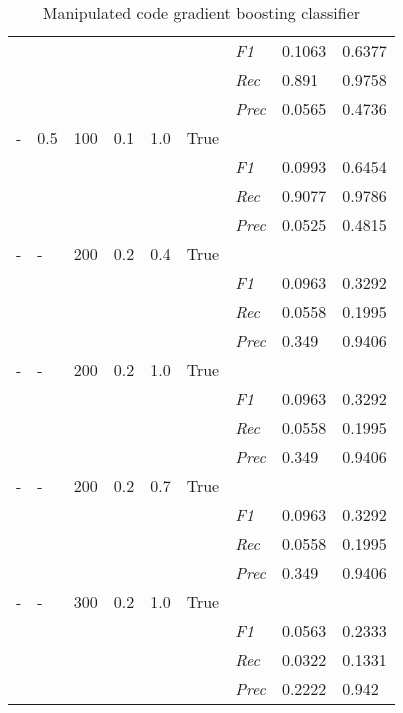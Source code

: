 \begin{table}[]
\begin{tabularx}{\textwidth}{XXXXXX|X|X|X}
    & & & & & & \textit{F1} & 0.1063 & 0.6377        \\
    & & & & & & \textit{Rec} &  0.891 & 0.9758    \\
    & & & & & & \textit{Prec} & 0.0565 & 0.4736  \\ \midrule
    - & 0.5 & 100 & 0.1 & 1.0 &True & & &  \\
    & & & & & & \textit{F1} & 0.0993 & 0.6454        \\
    & & & & & & \textit{Rec} &  0.9077 & 0.9786    \\
    & & & & & & \textit{Prec} & 0.0525 & 0.4815  \\ \midrule
    - & - & 200 & 0.2 & 0.4 &True & & &  \\
    & & & & & & \textit{F1} & 0.0963 & 0.3292        \\
    & & & & & & \textit{Rec} &  0.0558 & 0.1995    \\
    & & & & & & \textit{Prec} & 0.349 & 0.9406  \\ \midrule
    - & - & 200 & 0.2 & 1.0 &True & & &  \\
    & & & & & & \textit{F1} & 0.0963 & 0.3292        \\
    & & & & & & \textit{Rec} &  0.0558 & 0.1995    \\
    & & & & & & \textit{Prec} & 0.349 & 0.9406  \\ \midrule
    - & - & 200 & 0.2 & 0.7 &True & & &  \\
    & & & & & & \textit{F1} & 0.0963 & 0.3292        \\
    & & & & & & \textit{Rec} &  0.0558 & 0.1995    \\
    & & & & & & \textit{Prec} & 0.349 & 0.9406  \\ \midrule
    - & - & 300 & 0.2 & 1.0 &True & & &  \\
    & & & & & & \textit{F1} & 0.0563 & 0.2333        \\
    & & & & & & \textit{Rec} &  0.0322 & 0.1331    \\
    & & & & & & \textit{Prec} & 0.2222 & 0.942  \\ \midrule
    \end{tabularx}
    \caption{Manipulated code gradient boosting classifier}
    \label{tab:rq3_gradient_boosting_classifier}
    \end{table}
    
